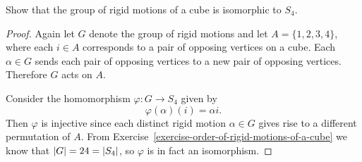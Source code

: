  Show that the group of rigid motions of a cube is
isomorphic to $S_4$.
\begin{proof}
  Again let $G$ denote the group of rigid motions and let
  $A = \{1,2,3,4\}$, where each $i\in A$ corresponds to a pair of
  opposing vertices on a cube. Each $\alpha\in G$ sends each pair of
  opposing vertices to a new pair of opposing vertices. Therefore $G$
  acts on $A$.

  Consider the homomorphism $\varphi\colon G\to S_4$ given by
  \begin{equation*}
    \varphi(\alpha)(i) = \alpha i.
  \end{equation*}
  Then $\varphi$ is injective since each distinct rigid motion
  $\alpha\in G$ gives rise to a different permutation of $A$. From
  Exercise~\ref{exercise-order-of-rigid-motions-of-a-cube} we know
  that $\lvert{G}\rvert = 24 = \lvert{S_4}\rvert$, so $\varphi$ is in fact an
  isomorphism.
\end{proof}
